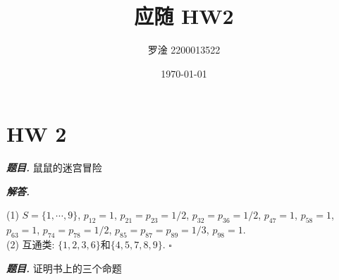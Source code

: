 \documentclass[10pt, a4paper, oneside]{ctexart}
\title{\textbf{应随 HW2}}
\author{罗淦 2200013522}
\date{\today}
\newenvironment{problem}{\begin{framed}\par\noindent\textbf{\textit{题目. }}}{\end{framed}\par}
\newenvironment{solution}{%
  \par\noindent\textbf{\textit{解答. }}\ignorespaces
}{%
  \hfill\ensuremath{\square}\par %
}
\begin{document}
\maketitle


\section{HW 2}



\begin{problem}
    鼠鼠的迷宫冒险
\end{problem}
\begin{solution}
(1) $S=\{1,\cdots,9\}$, $p_{12}=1$, $p_{21}=p_{23}=1/2$, $p_{32}=p_{36}=1/2$, $p_{47}=1$, $p_{58}=1$, $p_{63}=1$, $p_{74}=p_{78}=1/2$, $p_{85}=p_{87}=p_{89}=1/3$, $p_{98}=1$.\\
(2) 互通类: $\{1,2,3,6\}$和$\{4,5,7,8,9\}$.  
\end{solution}

\begin{problem}
    证明书上的三个命题
\end{problem}
\end{document}
